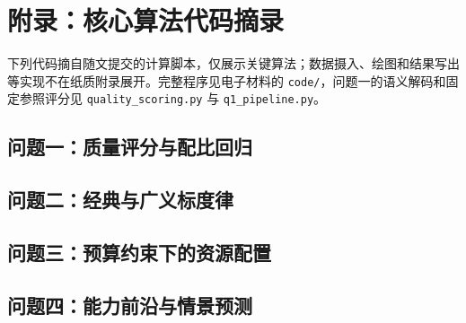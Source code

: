 \section{附录：核心算法代码摘录}
\label{app:core-code}

下列代码摘自随文提交的计算脚本，仅展示关键算法；数据摄入、绘图和结果写出等实现不在纸质附录展开。完整程序见电子材料的 \texttt{code/}，问题一的语义解码和固定参照评分见 \texttt{quality\_scoring.py} 与 \texttt{q1\_pipeline.py}。


\subsection{问题一：质量评分与配比回归}









\subsection{问题二：经典与广义标度律}





\subsection{问题三：预算约束下的资源配置}



\subsection{问题四：能力前沿与情景预测}




